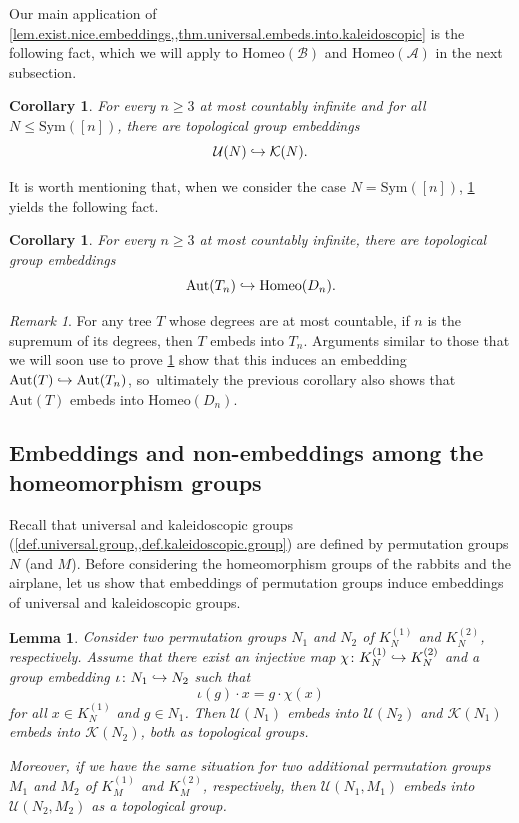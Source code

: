 \documentclass[JEP,XML,SOM,Unicode,NoFloatCountersInSection,published]{cedram}
\newcommand\hto{\mathrel{\lhook\joinrel\to}}
\theoremstyle{plain}
\newtheorem{corollary}[theorem]{Corollary}
\newtheorem{lemma}[theorem]{Lemma}
\theoremstyle{definition}
\theoremstyle{remark}
\newtheorem{remark}[theorem]{Remark}
\newcommand{\Aut}{\mathrm{Aut}}
\newcommand{\Sym}{\mathrm{Sym}}
\newcommand{\Homeo}{\mathrm{Homeo}}
\newcommand{\A}{\mathcal{A}}
\newcommand{\B}{\mathcal{B}}
\newcommand{\U}{\mathcal{U}}
\newcommand{\K}{\mathcal{K}}
\begin{document}
Our main application of \cref{lem.exist.nice.embeddings,,thm.universal.embeds.into.kaleidoscopic} is the following fact, which we will apply to $\Homeo(\B)$ and $\Homeo(\A)$ in the next subsection.

\begin{corollary}
\label{cor.universal.embeds.into.kaleidoscopic}
For every $n \geq 3$ at most countably infinite and for all $N \leq \Sym([n])$, there are topological group embeddings\vspace*{-3pt}
\[
 \U(N) \hto \K(N). 
\]
\end{corollary}

It is worth mentioning that, when we consider the case $N=\Sym([n])$, \cref{cor.universal.embeds.into.kaleidoscopic} yields the following fact.

\begin{corollary}
For every $n \geq 3$ at most countably infinite, there are topological group embeddings\vspace*{-3pt}
\[
 \Aut(T_n) \hto \Homeo(D_n). 
\]
\end{corollary}

\begin{remark}
For any tree $T$ whose degrees are at most countable, if $n$ is the supremum of its degrees, then $T$ embeds into $T_n$.
Arguments similar to those that we will soon use to prove \cref{lem.embeddings} show that this induces an embedding $\Aut(T) \hto \Aut(T_n)$, so~ultimately the previous corollary also shows that $\Aut(T)$ embeds into $\Homeo(D_n)$.
\end{remark}

\subsection{Embeddings and non-embeddings among the homeomorphism groups}

Recall that universal and kaleidoscopic groups (\cref{def.universal.group,,def.kaleidoscopic.group}) are defined by permutation groups $N$ (and $M$).
Before considering the homeomorphism groups of the rabbits and the airplane, let us show that embeddings of permutation groups induce embeddings of universal and kaleidoscopic groups.

\begin{lemma}
\label{lem.embeddings}
Consider two permutation groups $N_1$ and $N_2$ of $K_N^{(1)}$ and $K_N^{(2)}$, respectively.
Assume that there exist an injective map $\chi \colon K_N^{(1)} \hto K_N^{(2)}$ and a group embedding $\iota \colon N_1 \hto N_2$ such that\vspace*{-3pt}
\[
 \iota(g) \cdot x = g \cdot \chi(x) 
\]
for all $x \in K_N^{(1)}$ and $g \in N_1$.
Then $\U(N_1)$ embeds into $\U(N_2)$ and $\K(N_1)$ embeds into $\K(N_2)$, both as topological groups.

Moreover, if we have the same situation for two additional permutation groups $M_1$ and $M_2$ of $K_M^{(1)}$ and $K_M^{(2)}$, respectively, then $\U(N_1, M_1)$ embeds into $\U(N_2, M_2)$ as a topological group.
\end{lemma}
\end{document}

